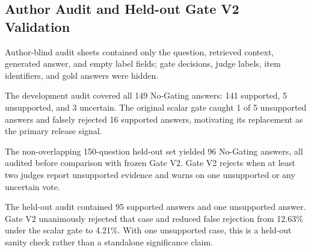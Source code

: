 \documentclass[smallextended]{svjour3}
\begin{document}
\subsection{Author Audit and Held-out Gate V2 Validation}
\label{subsec:human_validation}
Author-blind audit sheets contained only the question, retrieved context, generated answer, and empty label fields; gate decisions, judge labels, item identifiers, and gold answers were hidden.

The development audit covered all 149 No-Gating answers: 141 supported, 5 unsupported, and 3 uncertain. The original scalar gate caught 1 of 5 unsupported answers and falsely rejected 16 supported answers, motivating its replacement as the primary release signal.

The non-overlapping 150-question held-out set yielded 96 No-Gating answers, all audited before comparison with frozen Gate V2. Gate V2 rejects when at least two judges report unsupported evidence and warns on one unsupported or any uncertain vote.

\begin{table}[H]
\centering
\caption{Held-out QASPER author audit of frozen Gate V2 decisions. Metrics are computed on the 96 No-Gating answers that entered the author-blind audit; overall coverage uses the 150-question held-out denominator.}
\label{tab:heldout_gate_v2_audit}
\renewcommand{\arraystretch}{1.15}
\end{table}
\FloatBarrier

The held-out audit contained 95 supported answers and one unsupported answer. Gate V2 unanimously rejected that case and reduced false rejection from 12.63\% under the scalar gate to 4.21\%. With one unsupported case, this is a held-out sanity check rather than a standalone significance claim.
\end{document}
